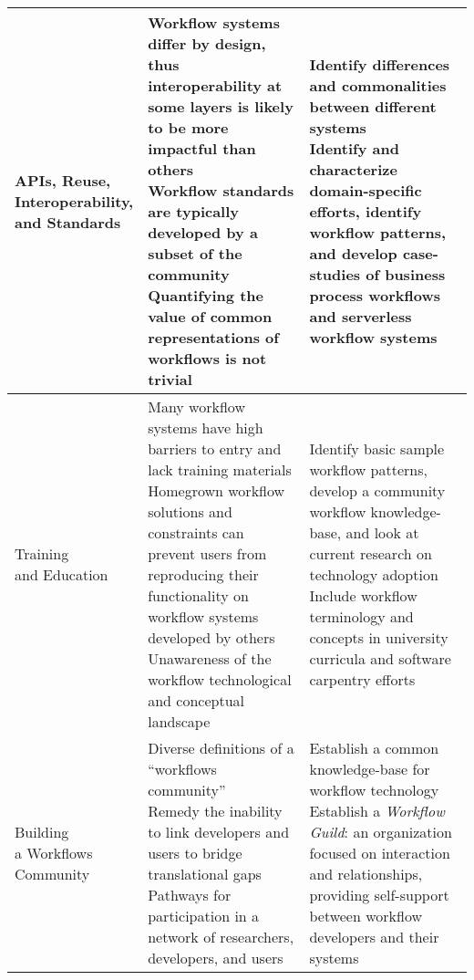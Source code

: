 \begin{table*}[!th]
\begin{tabular}{p{1.3cm}p{7.7cm}p{7.7cm}}
\makecell[l]{APIs, Reuse,\\Interoperability,\\and Standards} &
\bp{7.7cm}{
    Workflow systems differ by design, thus interoperability at some layers is likely to be more impactful than others
    \\
    Workflow standards are typically developed by a subset of the community
    \\
    Quantifying the value of common representations of workflows is not trivial
}
&
\bp{7.7cm}{
    Identify differences and commonalities between different systems
    \\
    Identify and characterize domain-specific efforts, identify workflow patterns, and develop case-studies of business process workflows and serverless workflow systems
}
\\
\midrule

\makecell[l]{Training\\and Education} &
\bp{7.7cm}{
    Many workflow systems have high barriers to entry and lack training materials
    \\
    Homegrown workflow solutions and constraints can prevent users from reproducing their functionality on workflow systems developed by others
    \\
    Unawareness of the workflow technological and conceptual landscape
}
&
\bp{7.7cm}{
    Identify basic sample workflow patterns, develop a community workflow knowledge-base, and look at current research on technology adoption
    \\
    Include workflow terminology and concepts in university curricula and software carpentry efforts
}
\\
\midrule

\makecell[l]{Building\\a Workflows\\Community} &
\bp{7.7cm}{
    Diverse definitions of a ``workflows community''
    \\
    Remedy the inability to link developers and users to bridge translational gaps
    \\
    Pathways for participation in a network of researchers, developers, and users
}
& 
\bp{7.7cm}{
    Establish a common knowledge-base for workflow technology
    \\
    Establish a \emph{Workflow Guild}: an organization focused on interaction and relationships, providing self-support between workflow developers and their systems
}
\\
\bottomrule
\end{tabular}
\label{tab:challenges}
\vspace{-10pt}
\end{table*}